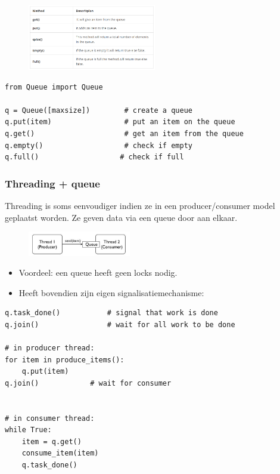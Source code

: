 \documentclass{article}
\begin{document}
\begin{figure}[H]
    \centering
    \includegraphics[width=0.5\textwidth]{queue2.png}
\end{figure}



\begin{verbatim}
from Queue import Queue

q = Queue([maxsize])        # create a queue
q.put(item)                 # put an item on the queue
q.get()                     # get an item from the queue
q.empty()                   # check if empty
q.full()                   # check if full
\end{verbatim}

\subsubsection{Threading + queue}

Threading is soms eenvoudiger indien ze in een producer/consumer model geplaatst worden.
Ze geven data via een queue door aan elkaar.

\begin{figure}[H]
    \centering
    \includegraphics[width=0.4\textwidth]{queue-threading.png}
\end{figure}

\begin{itemize}
    \item Voordeel: een queue heeft geen locks nodig. 
    \item Heeft bovendien zijn eigen signalisatiemechanisme:
\end{itemize}

\begin{verbatim}
q.task_done()           # signal that work is done
q.join()                # wait for all work to be done

# in producer thread:
for item in produce_items():
    q.put(item)
q.join()            # wait for consumer


# in consumer thread:
while True:
    item = q.get()
    consume_item(item)
    q.task_done()
\end{verbatim}
\end{document}
